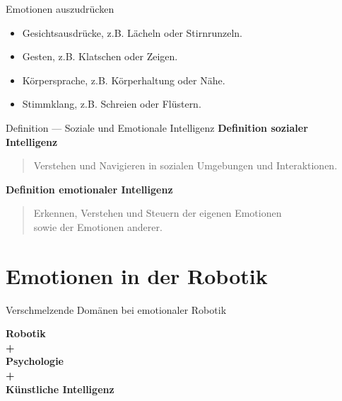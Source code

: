 \documentclass[aspectratio=169]{beamer}
\begin{document}
\begin{frame}{Emotionen auszudrücken}
  \begin{itemize}
    \item<1-> Gesichtsausdrücke, z.B. Lächeln oder Stirnrunzeln.
    \item<2-> Gesten, z.B. Klatschen oder Zeigen.
    \item<3-> Körpersprache, z.B. Körperhaltung oder Nähe.
    \item<4-> Stimmklang, z.B. Schreien oder Flüstern.
  \end{itemize}
\end{frame}

\begin{frame}{Definition --- Soziale und Emotionale Intelligenz}
  \textbf{Definition sozialer Intelligenz}
  \begin{quote}
    Verstehen und Navigieren in sozialen Umgebungen und Interaktionen.
  \end{quote}
  \vspace{1cm}

  \textbf{Definition emotionaler Intelligenz}
  \begin{quote}
    Erkennen, Verstehen und Steuern der eigenen Emotionen\\
    sowie der Emotionen anderer.
  \end{quote}
\end{frame}

\section{Emotionen in der Robotik}
\begin{frame}{Verschmelzende Domänen bei emotionaler Robotik}
  \begin{center}
    \LARGE\textbf{
      Robotik\\
      +\\
      Psychologie\\
      +\\
      Künstliche Intelligenz
    }
  \end{center}
\end{frame}
\end{document}
